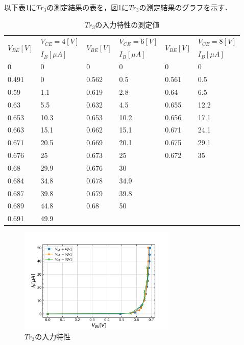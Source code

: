 \documentclass[10pt, a4j, dvipdfmx]{jarticle}
\begin{document}
    \newpage
    以下表\ref{tbl:3}に$Tr_3$の測定結果の表を，図\ref{ex:3}に$Tr_3$の測定結果のグラフを示す．
    \begin{table}[H]
        \centering
        \caption{$Tr_3$の入力特性の測定値}
        \label{tbl:3}
        \small
        \begin{tabular}{|l|l||l|l||l|l|}
            \hline
            \multirow{2}{*}{$V_{BE}[V]$} & $V_{CE}=4[V]$ & \multirow{2}{*}{$V_{BE}[V]$} & $V_{CE}=6[V]$ & \multirow{2}{*}{$V_{BE}[V]$} & $V_{CE}=8[V]$ \\ \cline{2-2} \cline{4-4} \cline{6-6} 
            & $I_B[\mu A]$   &                         & $I_B[\mu A]$   &                         & $I_B[\mu A]$   \\ \hline
            0     & 0    & 0     & 0    & 0     & 0    \\ \hline
            0.491 & 0    & 0.562 & 0.5  & 0.561 & 0.5  \\ \hline
            0.59  & 1.1  & 0.619 & 2.8  & 0.64  & 6.5  \\ \hline
            0.63  & 5.5  & 0.632 & 4.5  & 0.655 & 12.2 \\ \hline
            0.653 & 10.3 & 0.653 & 10.2 & 0.656 & 17.1 \\ \hline
            0.663 & 15.1 & 0.662 & 15.1 & 0.671 & 24.1 \\ \hline
            0.671 & 20.5 & 0.669 & 20.1 & 0.675 & 29.1 \\ \hline
            0.676 & 25   & 0.673 & 25   & 0.672 & 35   \\ \hline
            0.68  & 29.9 & 0.676 & 30   &       &      \\ \hline
            0.684 & 34.8 & 0.678 & 34.9 &       &      \\ \hline
            0.687 & 39.8 & 0.679 & 39.8 &       &      \\ \hline
            0.689 & 44.8 & 0.68  & 50   &       &      \\ \hline
            0.691 & 49.9 &       &      &       &      \\ \hline
        \end{tabular}
        \normalsize
    \end{table}
    \begin{figure}[H]
        \centering
        \includegraphics[height=50mm]{ex-3.png}
        \caption{$Tr_3$の入力特性}
        \label{ex:3}
    \end{figure}
\end{document}
